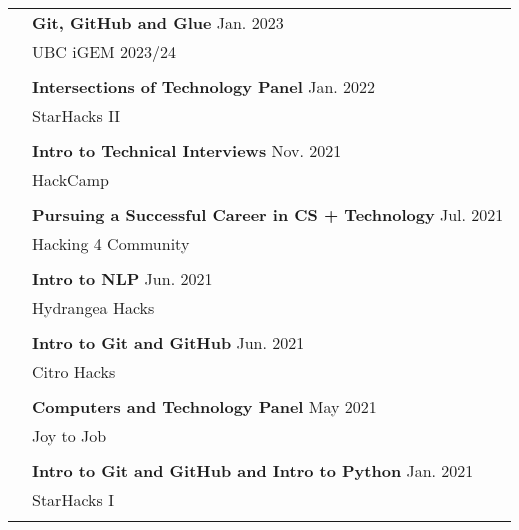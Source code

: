 \documentclass[letterpaper, 11pt]{article}
\begin{document}
\begin{longtable}{p{1.3in}p{4.8in}}
{\color{Blue}{Talks and tutorials}}
& \textbf{Git, GitHub and Glue} \hfill Jan. 2023 \\
& UBC iGEM 2023/24 \\
& \\

& \textbf{Intersections of Technology Panel} \hfill Jan. 2022 \\
& StarHacks II \\
& \\

& \textbf{Intro to Technical Interviews} \hfill Nov. 2021 \\
& HackCamp \\
& \\

& \textbf{Pursuing a Successful Career in CS + Technology} \hfill Jul. 2021 \\
& Hacking 4 Community \\
& \\

& \textbf{Intro to NLP} \hfill Jun. 2021 \\
& Hydrangea Hacks \\
& \\

& \textbf{Intro to Git and GitHub} \hfill Jun. 2021 \\
& Citro Hacks \\
& \\

& \textbf{Computers and Technology Panel} \hfill May 2021 \\
& Joy to Job \\
& \\

& \textbf{Intro to Git and GitHub and Intro to Python} \hfill Jan. 2021 \\
& StarHacks I \\
& \\




\end{longtable}
\end{document}
